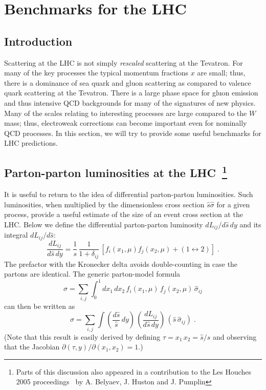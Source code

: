 \documentclass[12pt]{iopart}
\begin{document}
\section{Benchmarks for the LHC}
\label{sec:lhc}

\subsection{Introduction}
\label{sec:lhcintro}

Scattering at the LHC is not simply {\it rescaled} scattering at the Tevatron. For many of the key processes the typical momentum fractions
$x$ are small;  thus, there is a dominance of sea quark and gluon scattering as compared to valence  quark
scattering at the Tevatron. There is a large phase space for gluon emission and thus intensive  QCD backgrounds for many of
the signatures of new physics. Many of the scales relating to  interesting processes are large compared to the $W$ mass; thus,
electroweak corrections can  become important even for nominally QCD processes. In this section, we will try to provide some
useful benchmarks for LHC predictions.  

\subsection{Parton-parton luminosities at the LHC~\protect\footnote{
Parts of this discussion also appeared in a contribution to the Les Houches 2005
proceedings~\cite{Buttar:2006zd} by A. Belyaev, J. Huston and J. Pumplin}}
\label{sec:lum}

It is useful to return to the idea of  differential parton-parton luminosities. Such luminosities, when multiplied by the dimensionless 
cross section $\hat{s}\hat{\sigma}$ for a given process, provide a useful estimate  of 
the size of an event cross section at the LHC. 
Below we define the differential parton-parton luminosity
$dL_{ij}/d\hat{s}\,dy$ and its integral $dL_{ij}/d\hat{s}$:
\begin{equation}
\frac{d L_{ij}}{d\hat{s}\,dy} = 
\frac{1}{s} \, \frac{1}{1+\delta_{ij}} \, 
[f_i(x_1,\mu) f_j(x_2,\mu) + (1\leftrightarrow 2)] \; .
\label{eq1}
\end{equation}
The prefactor with the Kronecker delta avoids double-counting in case the
partons are identical.  The generic parton-model formula 
\begin{equation}
\sigma = \sum_{i,j} \int_0^1 dx_1 \, dx_2 \, 
f_i(x_1,\mu) \, f_j(x_2,\mu) \, \hat{\sigma}_{ij}
\end{equation}
can then be written as 
\begin{equation}
\sigma = \sum_{i,j} \int \left(\frac{d\hat{s}}{\hat{s}} \, dy\right) 
\, \left(\frac{d L_{ij}}{d\hat{s}\,dy}\right) \, 
\left(\hat{s} \,\hat{\sigma}_{ij} \right) \; .
\label{eq:xseclum}
\end{equation}
(Note that this result is easily derived by defining $\tau = x_1 \, x_2 = \hat{s}/s$ 
and observing that the Jacobian $\partial(\tau,y)/\partial(x_1,x_2) = 1$.)
\end{document}
